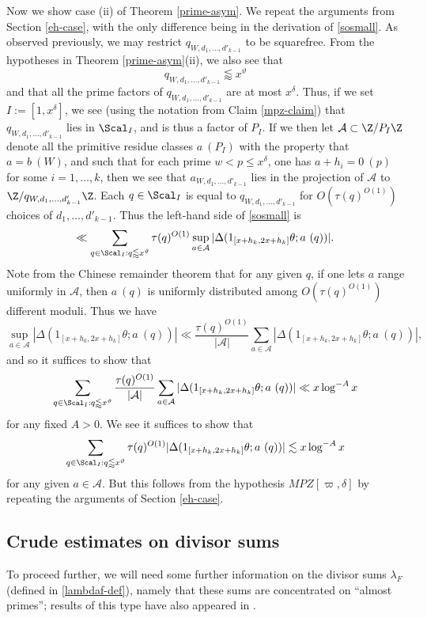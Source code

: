 Now we show case (ii) of Theorem \ref{prime-asym}.  We repeat the arguments from Section \ref{eh-case}, with the only difference being in the derivation of \eqref{sosmall}.  As observed previously, we may restrict $q_{W,d_1,\dots,d'_{k-1}}$ to be squarefree.  From the hypotheses in Theorem \ref{prime-asym}(ii), we also see that
$$ q_{W,d_1,\dots,d'_{k-1}} \lessapprox x^\vartheta$$
and that all the prime factors of $q_{W,d_1,\dots,d'_{k-1}}$ are at most $x^\delta$.  Thus, if we set $I := [1,x^\delta]$, we see (using the notation from Claim \ref{mpz-claim}) that $q_{W,d_1,\dots,d'_{k-1}}$ lies in $\Scal_I$, and is thus a factor of $P_I$.  If we then let ${\mathcal A} \subset \Z/P_I\Z$ denote all the primitive residue classes $a\ (P_I)$ with the property that $a = b\ (W)$, and such that for each prime $w < p \leq x^\delta$, one has $a + h_i = 0\ (p)$ for some $i=1,\dots,k$, then we see that $a_{W,d_1,\dots,d'_{k-1}}$ lies in the projection of ${\mathcal A}$ to $\Z/q_{W,d_1,\dots,d'_{k-1}}\Z$.  Each $q \in \Scal_I$ is equal to $q_{W,d_1,\dots,d'_{k-1}}$ for $O(\tau(q)^{O(1)})$ choices of $d_1,\dots,d'_{k-1}$.  Thus the left-hand side of \eqref{sosmall} is
$$ \ll \sum_{q \in \Scal_I: q \lessapprox x^\vartheta} \tau(q)^{O(1)} \sup_{a \in {\mathcal A}}
|\Delta( 1_{[x+h_k,2x+h_k]} \theta;  a\ (q))|.$$
Note from the Chinese remainder theorem that for any given $q$, if one lets $a$ range uniformly in ${\mathcal A}$, then $a\ (q)$ is uniformly distributed among $O( \tau(q)^{O(1)})$ different moduli.  Thus we have
$$
\sup_{a \in {\mathcal A}}
|\Delta( 1_{[x+h_k,2x+h_k]} \theta;  a\ (q))| \ll \frac{\tau(q)^{O(1)}}{|{\mathcal A}|} \sum_{a \in {\mathcal A}} |\Delta( 1_{[x+h_k,2x+h_k]} \theta;  a\ (q))|, $$
and so it suffices to show that
$$
\sum_{q \in \Scal_I: q \lessapprox x^\vartheta} \frac{\tau(q)^{O(1)}}{|{\mathcal A}|} \sum_{a \in {\mathcal A}}
|\Delta( 1_{[x+h_k,2x+h_k]} \theta;  a\ (q))|\ll x \log^{-A} x$$
for any fixed $A>0$.  We see it suffices to show that
$$
\sum_{q \in \Scal_I: q \lessapprox x^\vartheta} \tau(q)^{O(1)}
|\Delta( 1_{[x+h_k,2x+h_k]} \theta;  a\ (q))|\lesssim x \log^{-A} x$$
for any given $a \in {\mathcal A}$.  But this follows from the hypothesis $MPZ[\varpi,\delta]$ by repeating the arguments of Section \ref{eh-case}.

\subsection{Crude estimates on divisor sums}

To proceed further, we will need some further information on the divisor sums $\lambda_F$ (defined in \eqref{lambdaf-def}), namely that these sums are concentrated on ``almost primes''; results of this type have also appeared in \cite{pintz-szemeredi}.

